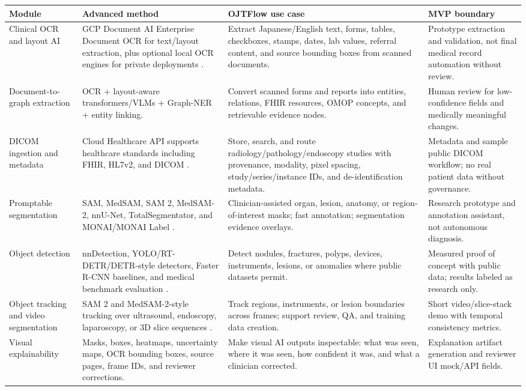 \begin{longtable}{p{}p{}p{}p{}}
\toprule
\textbf{Module} & \textbf{Advanced method} & \textbf{OJTFlow use case} & \textbf{MVP boundary} \\
\midrule
Clinical OCR and layout AI & GCP Document AI Enterprise Document OCR for text/layout extraction, plus optional local OCR engines for private deployments \cite{gcpDocumentAI}. & Extract Japanese/English text, forms, tables, checkboxes, stamps, dates, lab values, referral content, and source bounding boxes from scanned documents. & Prototype extraction and validation, not final medical record automation without review. \\
\addlinespace
Document-to-graph extraction & OCR + layout-aware transformers/VLMs + Graph-NER + entity linking. & Convert scanned forms and reports into entities, relations, FHIR resources, OMOP concepts, and retrievable evidence nodes. & Human review for low-confidence fields and medically meaningful changes. \\
\addlinespace
DICOM ingestion and metadata & Cloud Healthcare API supports healthcare standards including FHIR, HL7v2, and DICOM \cite{gcpHealthcare}. & Store, search, and route radiology/pathology/endoscopy studies with provenance, modality, pixel spacing, study/series/instance IDs, and de-identification metadata. & Metadata and sample public DICOM workflow; no real patient data without governance. \\
\addlinespace
Promptable segmentation & SAM, MedSAM, SAM 2, MedSAM-2, nnU-Net, TotalSegmentator, and MONAI/MONAI Label \cite{sam2023,medsam2024,sam2,medsam2,nnunet,totalSegmentator,monaiLabel}. & Clinician-assisted organ, lesion, anatomy, or region-of-interest masks; fast annotation; segmentation evidence overlays. & Research prototype and annotation assistant, not autonomous diagnosis. \\
\addlinespace
Object detection & nnDetection, YOLO/RT-DETR/DETR-style detectors, Faster R-CNN baselines, and medical benchmark evaluation \cite{nndetection}. & Detect nodules, fractures, polyps, devices, instruments, lesions, or anomalies where public datasets permit. & Measured proof of concept with public data; results labeled as research only. \\
\addlinespace
Object tracking and video segmentation & SAM 2 and MedSAM-2-style tracking over ultrasound, endoscopy, laparoscopy, or 3D slice sequences \cite{sam2,medsam2}. & Track regions, instruments, or lesion boundaries across frames; support review, QA, and training data creation. & Short video/slice-stack demo with temporal consistency metrics. \\
\addlinespace
Visual explainability & Masks, boxes, heatmaps, uncertainty maps, OCR bounding boxes, source pages, frame IDs, and reviewer corrections. & Make visual AI outputs inspectable: what was seen, where it was seen, how confident it was, and what a clinician corrected. & Explanation artifact generation and reviewer UI mock/API fields. \\
\bottomrule
\end{longtable}

